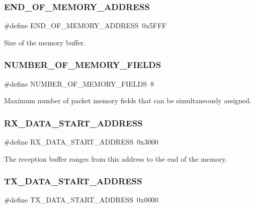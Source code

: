 \subsubsection{\texorpdfstring{END\_OF\_MEMORY\_ADDRESS}{END\_OF\_MEMORY\_ADDRESS}}
{\footnotesize\ttfamily \#define E\+N\+D\+\_\+\+O\+F\+\_\+\+M\+E\+M\+O\+R\+Y\+\_\+\+A\+D\+D\+R\+E\+SS~0x5\+F\+FF}



Size of the memory buffer. 

\mbox{\label{group__memory_ga31efd827f5e76320608065c79fc29e00}} 
\subsubsection{\texorpdfstring{NUMBER\_OF\_MEMORY\_FIELDS}{NUMBER\_OF\_MEMORY\_FIELDS}}
{\footnotesize\ttfamily \#define N\+U\+M\+B\+E\+R\+\_\+\+O\+F\+\_\+\+M\+E\+M\+O\+R\+Y\+\_\+\+F\+I\+E\+L\+DS~8}



Maximum number of packet memory fields that can be simultaneously assigned. 

\mbox{\label{group__memory_gab75619e07ad50e2b4b78684bd3dc81df}} 
\subsubsection{\texorpdfstring{RX\_DATA\_START\_ADDRESS}{RX\_DATA\_START\_ADDRESS}}
{\footnotesize\ttfamily \#define R\+X\+\_\+\+D\+A\+T\+A\+\_\+\+S\+T\+A\+R\+T\+\_\+\+A\+D\+D\+R\+E\+SS~0x3000}



The reception buffer ranges from this address to the end of the memory. 

\mbox{\label{group__memory_gaf952470b2ca20106b4998e400ac4236e}} 
\subsubsection{\texorpdfstring{TX\_DATA\_START\_ADDRESS}{TX\_DATA\_START\_ADDRESS}}
{\footnotesize\ttfamily \#define T\+X\+\_\+\+D\+A\+T\+A\+\_\+\+S\+T\+A\+R\+T\+\_\+\+A\+D\+D\+R\+E\+SS~0x0000}



